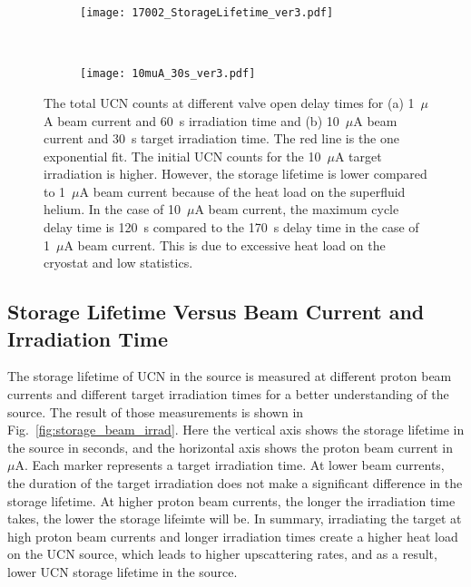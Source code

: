 \begin{figure}[h!]
  \centering
  \begin{subfigure}{.8\textwidth}
    \centering
    \texttt{[image: 17002\_StorageLifetime\_ver3.pdf]}
    \caption{}
    \label{fig:storage_example1}
  \end{subfigure}%
  \\
  \begin{subfigure}{.8\textwidth}
    \centering
    \texttt{[image: 10muA\_30s\_ver3.pdf]}
    \caption{}
    \label{fig:storage_example10}
  \end{subfigure}
  \caption[UCN storage lifetime extraction for two beam currents]{The
    total UCN counts at different valve open delay times for (a)
    1~$\mu$A beam current and 60~s irradiation time and (b) 10~$\mu$A
    beam current and 30~s target irradiation time. The red line is the
    one exponential fit. The initial UCN counts for the 10~$\mu$A
    target irradiation is higher. However, the storage lifetime is
    lower compared to 1~$\mu$A beam current because of the heat load
    on the superfluid helium. In the case of 10~$\mu$A beam current,
    the maximum cycle delay time is 120~s compared to the 170~s delay
    time in the case of 1~$\mu$A beam current. This is due to
    excessive heat load on the cryostat and low statistics.}
  \label{fig:storage_example}
\end{figure}


\subsection{Storage Lifetime Versus Beam Current and Irradiation Time}
The storage lifetime of UCN in the source is measured at different
proton beam currents and different target irradiation times for a
better understanding of the source. The result of those measurements
is shown in Fig.~\ref{fig:storage_beam_irrad}. Here the vertical axis
shows the storage lifetime in the source in seconds, and the
horizontal axis shows the proton beam current in $\mu$A. Each marker
represents a target irradiation time. At lower beam currents, the
duration of the target irradiation does not make a significant
difference in the storage lifetime. At higher proton beam currents,
the longer the irradiation time takes, the lower the storage lifeimte
will be. In summary, irradiating the target at high proton beam
currents and longer irradiation times create a higher heat load on the
UCN source, which leads to higher upscattering rates, and as a result,
lower UCN storage lifetime in the source.

